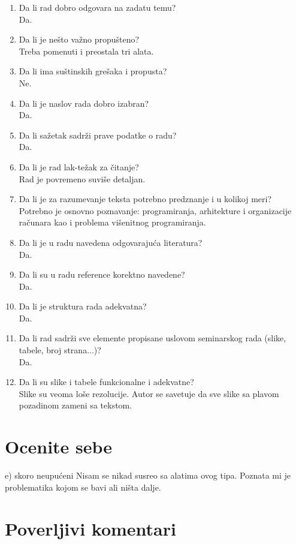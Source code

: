 \documentclass[a4paper]{article}
\begin{document}
\begin{enumerate}
\item Da li rad dobro odgovara na zadatu temu?\\
  Da.
\item Da li je nešto važno propušteno?\\
  Treba pomenuti i preostala tri alata.
\item Da li ima suštinskih grešaka i propusta?\\
  Ne.
\item Da li je naslov rada dobro izabran?\\
  Da.
\item Da li sažetak sadrži prave podatke o radu?\\
  Da.
\item Da li je rad lak-težak za čitanje?\\
  Rad je povremeno suviše detaljan.
\item Da li je za razumevanje teksta potrebno predznanje i u kolikoj meri?\\
  Potrebno je osnovno poznavanje: programiranja, arhitekture i organizacije računara kao i problema višenitnog programiranja.
\item Da li je u radu navedena odgovarajuća literatura?\\
  Da.
\item Da li su u radu reference korektno navedene?\\
  Da.
\item Da li je struktura rada adekvatna?\\
  Da.
\item Da li rad sadrži sve elemente propisane uslovom seminarskog rada (slike, tabele, broj strana...)?\\
  Da.
\item Da li su slike i tabele funkcionalne i adekvatne?\\
  Slike su veoma loše rezolucije. Autor se savetuje da sve slike sa plavom
  pozadinom zameni sa tekstom.
\end{enumerate}

\section{Ocenite sebe}
e) skoro neupućeni
Nisam se nikad susreo sa alatima ovog tipa.
Poznata mi je problematika kojom se bavi ali ništa dalje.

\section{Poverljivi komentari}
\end{document}
